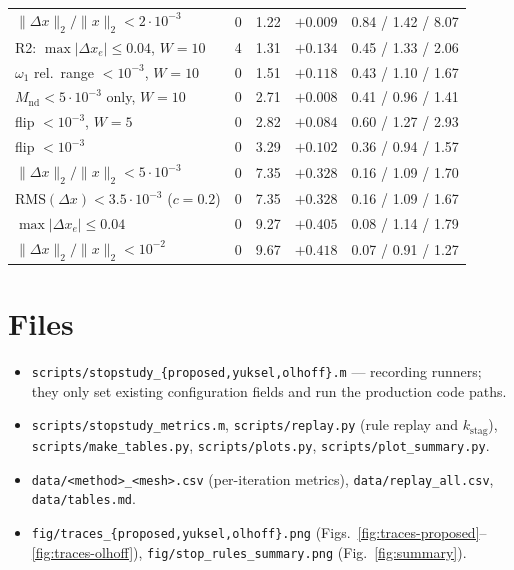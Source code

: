 \documentclass[11pt,a4paper]{article}
\newcommand{\Mnd}{M_{\mathrm{nd}}}
\newcommand{\kstag}{k_{\mathrm{stag}}}
\newcommand{\dx}{\Delta x}
\newcommand{\maxdx}{\max|\Delta x_e|}
\newcommand{\relL}{\|\Delta x\|_2/\|x\|_2}
\newcommand{\RMS}{\mathrm{RMS}}
\newcommand{\file}[1]{\texttt{#1}}
\begin{document}
\begin{table}[htbp]
\begin{tabular}{@{}lcccc@{}}
$\relL < 2\cdot10^{-3}$                                 & 0 & 1.22 & $+0.009$ & 0.84 / 1.42 / 8.07 \\
R2: $\maxdx \le 0.04$, $W{=}10$                          & 4 & 1.31 & $+0.134$ & 0.45 / 1.33 / 2.06 \\
$\omega_1$ rel.\ range $<10^{-3}$, $W{=}10$              & 0 & 1.51 & $+0.118$ & 0.43 / 1.10 / 1.67 \\
$\Mnd < 5\cdot10^{-3}$ only, $W{=}10$                    & 0 & 2.71 & $+0.008$ & 0.41 / 0.96 / 1.41 \\
flip $<10^{-3}$, $W{=}5$                                 & 0 & 2.82 & $+0.084$ & 0.60 / 1.27 / 2.93 \\
flip $<10^{-3}$                                         & 0 & 3.29 & $+0.102$ & 0.36 / 0.94 / 1.57 \\
$\relL < 5\cdot10^{-3}$                                 & 0 & 7.35 & $+0.328$ & 0.16 / 1.09 / 1.70 \\
$\RMS(\dx) < 3.5\cdot10^{-3}$ ($c{=}0.2$)                & 0 & 7.35 & $+0.328$ & 0.16 / 1.09 / 1.67 \\
$\maxdx \le 0.04$                                       & 0 & 9.27 & $+0.405$ & 0.08 / 1.14 / 1.79 \\
$\relL < 10^{-2}$                                       & 0 & 9.67 & $+0.418$ & 0.07 / 0.91 / 1.27 \\
\bottomrule
\end{tabular}
\end{table}

\section{Files}

\begingroup\raggedright
\begin{itemize}
\item \file{scripts/\allowbreak{}stopstudy\_\allowbreak{}\{proposed,yuksel,olhoff\}.m} --- recording
  runners; they only set existing configuration fields and run the production
  code paths.
\item \file{scripts/\allowbreak{}stopstudy\_\allowbreak{}metrics.m}, \file{scripts/\allowbreak{}replay.py} (rule replay
  and $\kstag$), \file{scripts/\allowbreak{}make\_\allowbreak{}tables.py}, \file{scripts/\allowbreak{}plots.py},
  \file{scripts/\allowbreak{}plot\_\allowbreak{}summary.py}.
\item \file{data/\allowbreak{}<method>\_\allowbreak{}<mesh>.csv} (per-iteration metrics),
  \file{data/\allowbreak{}replay\_\allowbreak{}all.csv}, \file{data/\allowbreak{}tables.md}.
\item \file{fig/\allowbreak{}traces\_\allowbreak{}\{proposed,yuksel,olhoff\}.png}
  (Figs.~\ref{fig:traces-proposed}--\ref{fig:traces-olhoff}),
  \file{fig/\allowbreak{}stop\_\allowbreak{}rules\_\allowbreak{}summary.png} (Fig.~\ref{fig:summary}).
\end{itemize}
\endgroup
\end{document}

